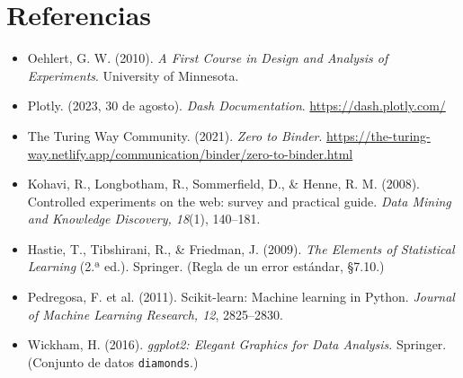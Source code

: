 \documentclass[12pt,letterpaper]{article}
\begin{document}
\section*{Referencias}

\begin{itemize}[leftmargin=1.2cm,itemsep=0.3em]
\item Oehlert, G. W. (2010). \textit{A First Course in Design and Analysis of Experiments}. University of Minnesota.
\item Plotly. (2023, 30 de agosto). \textit{Dash Documentation}. \url{https://dash.plotly.com/}
\item The Turing Way Community. (2021). \textit{Zero to Binder}. \url{https://the-turing-way.netlify.app/communication/binder/zero-to-binder.html}
\item Kohavi, R., Longbotham, R., Sommerfield, D., \& Henne, R. M. (2008). Controlled experiments on the web: survey and practical guide. \textit{Data Mining and Knowledge Discovery, 18}(1), 140--181.
\item Hastie, T., Tibshirani, R., \& Friedman, J. (2009). \textit{The Elements of Statistical Learning} (2.ª ed.). Springer. (Regla de un error estándar, §7.10.)
\item Pedregosa, F. et al. (2011). Scikit-learn: Machine learning in Python. \textit{Journal of Machine Learning Research, 12}, 2825--2830.
\item Wickham, H. (2016). \textit{ggplot2: Elegant Graphics for Data Analysis}. Springer. (Conjunto de datos \texttt{diamonds}.)
\end{itemize}
\end{document}
